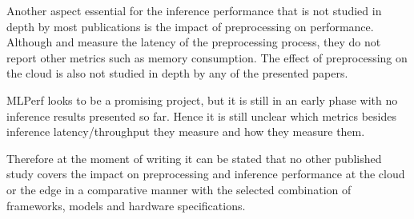 Another aspect essential for the inference performance that is not studied in depth by most publications is the impact of preprocessing on performance.
Although \cite{DBLP:conf/ic2e/Guo18} and \cite{DBLP:conf/mmsys/HanhirovaKSSHY18} measure the latency of the preprocessing process, they do not report other metrics such as memory consumption. The effect of preprocessing on the cloud is also not studied in depth by any of the presented papers.


MLPerf looks to be a promising project, but it is still in an early phase with no inference results presented so far. Hence it is still unclear which metrics besides inference latency/throughput they measure and how they measure them.

Therefore at the moment of writing it can be stated that no other published study covers the impact on preprocessing and inference performance at the cloud or the edge in a comparative manner with the selected combination of frameworks, models and hardware specifications. 



 \endinput 
